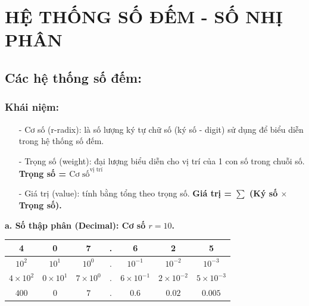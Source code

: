 \section{HỆ THỐNG SỐ ĐẾM - SỐ NHỊ PHÂN}
\subsection{Các hệ thống số đếm:}
\subsubsection{Khái niệm:}
\begin{itemize}
    \item[-] Cơ số (r-radix): là số lượng ký tự chữ số (ký số - digit) sử dụng để biểu diễn trong hệ thống số đếm.
    \item[-] Trọng số (weight): đại lượng biểu diễn cho vị trí của 1 con số trong chuỗi số.\\ \textbf{Trọng số = $\text{Cơ số}^\text{vị trí}$}
    \item[-] Giá trị (value): tính bằng tổng theo trọng số. \textbf{Giá trị = $\sum$ (Ký số $\times$ Trọng số).}
\end{itemize}
\textbf{a. Số thập phân (Decimal): Cơ số $r = 10$.}
\begin{table}[h!]
    \centering
    \begin{tabular}{|c|c|c|c|c|c|c|}
    \hline
    \textbf{4}                                   & \textbf{0}                                   & \textbf{7}                                   & \textbf{.} & \textbf{6}                                        & \textbf{2}                                        & \textbf{5}                                        \\ \hline
    $10^2$                        & $10^1$                        & $10^0$                        & .          & $10^{-1} $                       & $10^{-2}$                        & $10^{-3}$                        \\ 
    $4\times 10^2$ & $0\times 10^1$ & $7\times 10^0$ & .          & $6\times 10^{-1}$ & $2\times 10^{-2}$ & $5\times 10^{-3}$ \\ 
   $ 400 $                                         & $0$                                            & $7$                                            & .          & $0.6$                                               & $0.02$                                              & $0.005$                                             \\ \hline
    \end{tabular}
\end{table}
